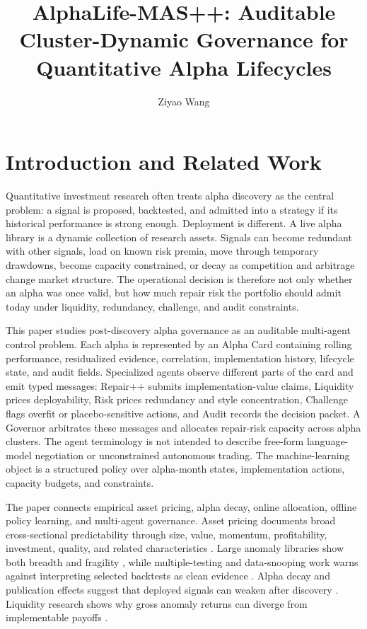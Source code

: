 \documentclass[sigconf,nonacm]{acmart}
\title{AlphaLife-MAS++: Auditable Cluster-Dynamic Governance for Quantitative Alpha Lifecycles}
\author{Ziyao Wang}
\affiliation{%
  \institution{Department of Mathematics and Statistics, Texas Tech University}
  \city{Lubbock}
  \state{Texas}
  \country{USA}
}
\begin{document}
\maketitle
\setlength{\bibsep}{1pt}

\section{Introduction and Related Work}

Quantitative investment research often treats alpha discovery as the central problem: a signal is proposed, backtested, and admitted into a strategy if its historical performance is strong enough. Deployment is different. A live alpha library is a dynamic collection of research assets. Signals can become redundant with other signals, load on known risk premia, move through temporary drawdowns, become capacity constrained, or decay as competition and arbitrage change market structure. The operational decision is therefore not only whether an alpha was once valid, but how much repair risk the portfolio should admit today under liquidity, redundancy, challenge, and audit constraints.

This paper studies post-discovery alpha governance as an auditable multi-agent control problem. Each alpha is represented by an Alpha Card containing rolling performance, residualized evidence, correlation, implementation history, lifecycle state, and audit fields. Specialized agents observe different parts of the card and emit typed messages: Repair++ submits implementation-value claims, Liquidity prices deployability, Risk prices redundancy and style concentration, Challenge flags overfit or placebo-sensitive actions, and Audit records the decision packet. A Governor arbitrates these messages and allocates repair-risk capacity across alpha clusters. The agent terminology is not intended to describe free-form language-model negotiation or unconstrained autonomous trading. The machine-learning object is a structured policy over alpha-month states, implementation actions, capacity budgets, and constraints.

The paper connects empirical asset pricing, alpha decay, online allocation, offline policy learning, and multi-agent governance. Asset pricing documents broad cross-sectional predictability through size, value, momentum, profitability, investment, quality, and related characteristics \cite{fama1992cross,fama1993common,jegadeesh1993returns,carhart1997persistence,novyMarx2013other,asness2013value,fama2015five,hou2015digesting}. Large anomaly libraries show both breadth and fragility \cite{green2017characteristics,feng2020taming,jensen2023replication}, while multiple-testing and data-snooping work warns against interpreting selected backtests as clean evidence \cite{white2000reality,hansen2005test,harvey2016and,bailey2014deflated}. Alpha decay and publication effects suggest that deployed signals can weaken after discovery \cite{mclean2016does}. Liquidity research shows why gross anomaly returns can diverge from implementable payoffs \cite{amihud2002illiquidity,acharya2005asset,pastor2003liquidity,frazzini2018trading}.
\end{document}

